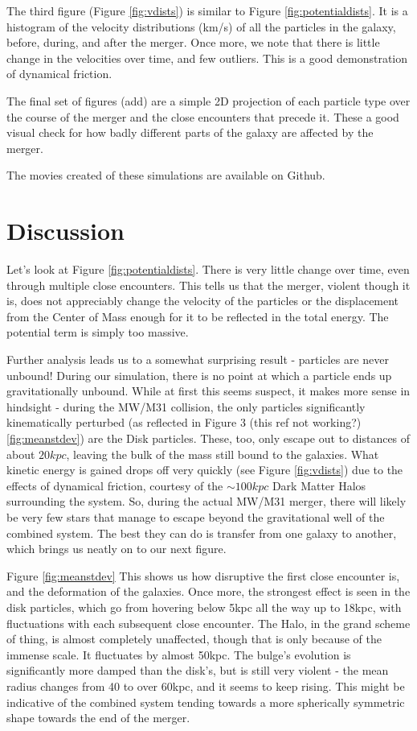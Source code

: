 \documentclass[linenumbers]{aastex631} %
\begin{document}
The third figure (Figure \ref{fig:vdists}) is similar to Figure \ref{fig:potentialdists}. It is a histogram of the velocity distributions (km/s) of all the particles in the galaxy, before, during, and after the merger. Once more, we note that there is little change in the velocities over time, and few outliers. This is a good demonstration of dynamical friction.

The final set of figures (add) are a simple 2D projection of each particle type over the course of the merger and the close encounters that precede it. These a good visual check for how badly different parts of the galaxy are affected by the merger.

The movies created of these simulations are available on Github.

\section{Discussion}
Let's look at Figure \ref{fig:potentialdists}. There is very little change over time, even through multiple close encounters. This tells us that the merger, violent though it is, does not appreciably change the velocity of the particles or the displacement from the Center of Mass enough for it to be reflected in the total energy. The potential term is simply too massive.

Further analysis leads us to a somewhat surprising result - particles are never unbound! During our simulation, there is no point at which a particle ends up gravitationally unbound. While at first this seems suspect, it makes more sense in hindsight - during the MW/M31 collision, the only particles significantly kinematically perturbed (as reflected in Figure 3 (this ref not working?)\ref{fig:meanstdev}) are the Disk particles. These, too, only escape out to distances of about $20kpc$, leaving the bulk of the mass still bound to the galaxies. What kinetic energy is gained drops off very quickly (see Figure \ref{fig:vdists}) due to the effects of dynamical friction, courtesy of the $\sim 100kpc$ Dark Matter Halos surrounding the system. So, during the actual MW/M31 merger, there will likely be very few stars that manage to escape beyond the gravitational well of the combined system. The best they can do is transfer from one galaxy to another, which brings us neatly on to our next figure.

Figure \ref{fig:meanstdev} This shows us how disruptive the first close encounter is, and the deformation of the galaxies. Once more, the strongest effect is seen in the disk particles, which go from hovering below 5kpc all the way up to 18kpc, with fluctuations with each subsequent close encounter. The Halo, in the grand scheme of thing, is almost completely unaffected, though that is only because of the immense scale. It fluctuates by almost 50kpc. The bulge's evolution is significantly more damped than the disk's, but is still very violent - the mean radius changes from 40 to over 60kpc, and it seems to keep rising. This might be indicative of the combined system tending towards a more spherically symmetric shape towards the end of the merger.
\end{document}

